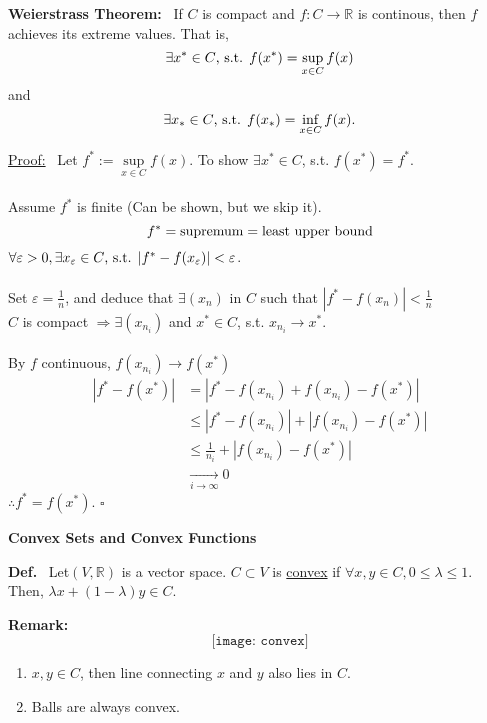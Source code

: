 \documentclass[letterpaper]{article}
\newcommand{\real}{\mathbb R}  %
\begin{document}
\noindent \textbf{Weierstrass Theorem:}~ If $C$ is compact and $f: C \to \real$ is continous, then $f$ achieves its extreme values. That is,
    \begin{equation*}
        \exists x^* \in C\textnormal{, s.t. }f(x^*)=\sup\limits_{x\in C}f(x)
    \end{equation*}
    and
    \begin{equation*}
        \exists x_* \in C\textnormal{, s.t. }f(x_*)=\inf\limits_{x\in C}f(x).
    \end{equation*}

\noindent \underline{Proof:}~ Let $f^*:=\sup\limits_{x\in C}f(x)$. To show $\exists x^* \in C$, s.t. $f(x^*)=f^*$.\\ \\
    Assume $f^*$ is finite (Can be shown, but we skip it).
    \begin{equation*}
        f^*=\textnormal{supremum}=\textnormal{least upper bound}
    \end{equation*}
    $\forall \varepsilon>0, \exists x_{\varepsilon}\in C\textnormal{, s.t. }|f^*-f(x_{\varepsilon})|<\varepsilon$.\\ \\
    Set $\varepsilon=\frac{1}{n}$, and deduce that $\exists (x_n)$ in $C$ such that $|f^*-f(x_n)|<\frac{1}{n}$\\
    $C$ is compact $\Rightarrow \exists (x_{n_i})$ and $x^* \in C$, s.t.	$x_{n_i} \to x^*$.\\ \\
    By $f$ continuous, $f(x_{n_i})\to f(x^*)$
    \begin{align*}
        |f^*-f(x^*)|&=|f^*-f(x_{n_i})+f(x_{n_i})-f(x^*)|\\
        &\leqslant|f^*-f(x_{n_i})|+|f(x_{n_i})-f(x^*)|\\
        &\leqslant \frac{1}{n_i}+|f(x_{n_i})-f(x^*)|\\
        &\xrightarrow[i\rightarrow\infty]{} 0
    \end{align*}
    $\therefore f^*=f(x^*)$. $\square$

\begin{center}\textbf{Convex Sets and Convex Functions}\end{center}

    \noindent \textbf{Def.}~ Let$(V,\real)$ is a vector space. $C \subset V$ is \underline{convex} if $\forall x,y \in C , 0\leqslant \lambda \leqslant 1$. Then, $\lambda x +(1-\lambda)y \in C$.
    
\noindent \textbf{Remark:}
$$\texttt{[image: convex]}$$
\renewcommand{\labelenumi}{(\alph{enumi})}
\begin{enumerate}
\item
$x,y \in C$, then line connecting $x$ and $y$ also lies in $C$.
\item
Balls are always convex.
\end{enumerate}
\end{document}

